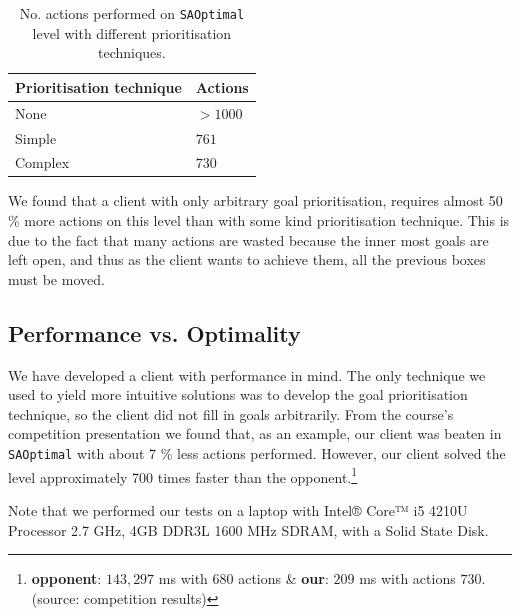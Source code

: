 \begin{table}[h!]
  \centering
  \begin{tabular}{@{}ll@{}}
    \toprule
    Prioritisation technique & Actions \\
    \midrule
    None    & $>1000$ \\
    Simple  & $761$ \\
    Complex & $730$ \\
    \bottomrule
  \end{tabular}
  \caption{\label{tab:SAOptimal_results}No. actions performed on \texttt{SAOptimal} level with different prioritisation techniques.}
\end{table}

We found that a client with only arbitrary goal prioritisation, requires almost 50 \% more actions on this level than with some kind prioritisation technique.
This is due to the fact that many actions are wasted because the inner most goals are left open, and thus as the client wants to achieve them, all the previous boxes must be moved.

\subsection{Performance vs. Optimality}
\label{sec:performance vs. optimality}

We have developed a client with performance in mind.
The only technique we used to yield more intuitive solutions was to develop the goal prioritisation technique, so the client did not fill in goals arbitrarily.
From the course's competition presentation we found that, as an example, our client was beaten in \texttt{SAOptimal} with about 7 \% less actions performed.
However, our client solved the level approximately 700 times faster than the opponent.\footnote{\textbf{opponent}: $143,297$ ms with $680$ actions \& \textbf{our}: $209$ ms with actions $730$. (source: competition results)}

Note that we performed our tests on a laptop with Intel® Core™ i5 4210U Processor 2.7 GHz, 4GB DDR3L 1600 MHz SDRAM, with a Solid State Disk.


